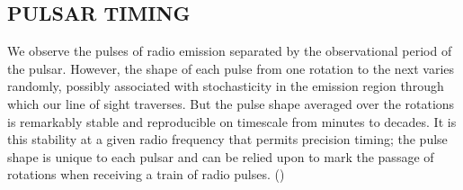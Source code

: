 \documentclass{article}
\begin{document}
\newpage
\subsection{PULSAR TIMING}
We observe the pulses of radio emission separated by the observational period of the pulsar. However, the shape of each pulse from one rotation to the next varies randomly, possibly associated with stochasticity in the emission region through which our line of sight traverses. But the pulse shape averaged over the rotations is remarkably stable and reproducible on timescale from minutes to decades. It is this stability at a given radio frequency that permits precision timing; the pulse shape is unique to each pulsar and can be relied upon to mark the passage of rotations when receiving a train of radio pulses. (\cite{taylor2021nanohertz})\\
\end{document}
